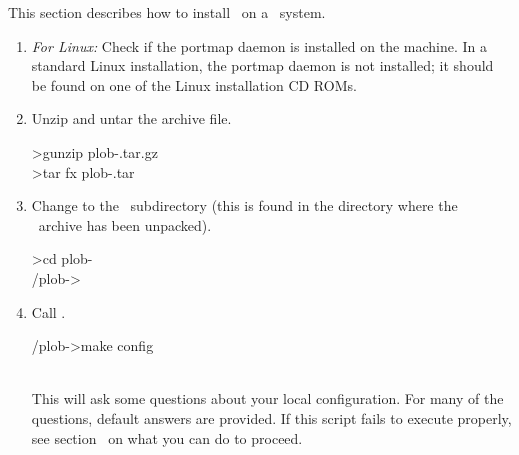 This section describes how to install \plob\ on a \unix\ system.
\begin{enumerate}

\item\emph{For Linux:} Check if the portmap daemon is installed on the
  machine. In a standard Linux installation, the portmap daemon is not
  installed; it should be found on one of the Linux installation CD
  ROMs.

\item Unzip and untar the archive file.\\[\smallskipamount]
\begin{tt}\CodeSize
\td>gunzip plob-\thisversion.tar.gz\\
\td>tar fx plob-\thisversion.tar
\end{tt}

\item Change to the \ subdirectory (this is
  found in the directory where the \ 
  archive has been unpacked).\\[\smallskipamount]
\begin{tt}\CodeSize
\td>cd plob-\thisversion\\
\td/plob-\thisversion>
\end{tt}

\item\label{itm:config}Call .\\[\smallskipamount]
\begin{tt}\CodeSize
\td/plob-\thisversion>make config
\end{tt}\\[\smallskipamount]
  This will ask some questions about your local configuration. For
  many of the questions, default answers are provided. If this script
  fails to execute properly, see
  section~ on what you can do to
  proceed.


\end{enumerate}

